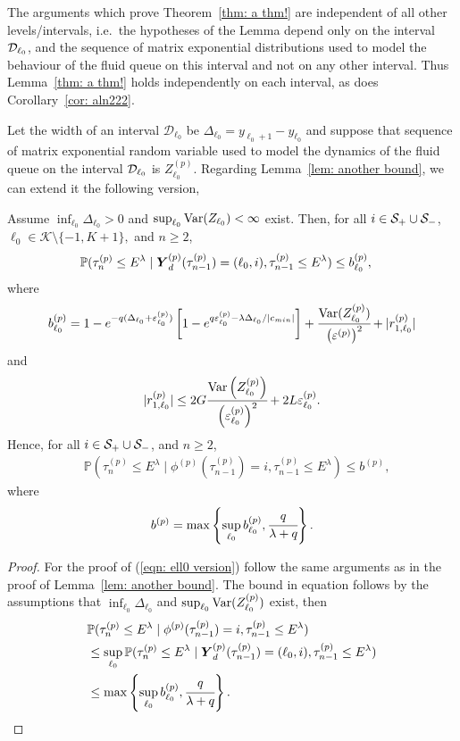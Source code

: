 The arguments which prove Theorem~\ref{thm: a thm!} are independent of all other levels/intervals, i.e.~the hypotheses of the Lemma depend only on the interval \(\mathcal{D}_{\ell_0}\), and the sequence of matrix exponential distributions used to model the behaviour of the fluid queue on this interval and not on any other interval. Thus Lemma~\ref{thm: a thm!} holds independently on each interval, as does Corollary~\ref{cor: aln222}.

Let the width of an interval \(\mathcal D_{\ell_0}\) be \(\Delta_{\ell_0}=y_{\ell_0+1}-y_{\ell_0}\) and suppose that sequence of matrix exponential random variable used to model the dynamics of the fluid queue on the interval \(\mathcal{D}_{\ell_0}\) is \(Z_{\ell_0}^{(p)}\). Regarding Lemma~\ref{lem: another bound}, we can extend it the following version, 
\begin{lem}\label{lem: another bound sdfg}
	Assume \(\inf_{\ell_0}\Delta_{\ell_0}>0\) and \(\sup_{\ell_0}\mathrm{Var}(Z_{\ell_0})<\infty\) exist. Then, for all \(i\in\mathcal S_+\cup \mathcal{S}_-\), \(\ell_0\in\mathcal K\setminus\{-1,K+1\},\) and \(n\geq 2\), 
	\begin{align}
		&\mathbb P(\tau_n^{(p)}\leq E^\lambda \mid \boldsymbol Y_d^{(p)}(\tau_{n-1}^{(p)}) = (\ell_0,i), \tau_{n-1}^{(p)}\leq  E^\lambda ) \leq b_{\ell_0}^{(p)},\label{eqn: ell0 version}
	\end{align}
	where 
	\[b_{\ell_0}^{(p)} = 1-e^{-q(\Delta_{\ell_0}+\varepsilon_{\ell_0}^{(p)})}\left[1-e^{q\varepsilon_{\ell_0}^{(p)}-\lambda \Delta_{\ell_0}/|c_{min}|}\right] + \cfrac{\mathrm{Var}(Z_{\ell_0}^{(p)})}{\left(\varepsilon^{(p)}\right)^2} + |r_{1,\ell_0}^{(p)}| \]
	and  
	\[|r_{1,\ell_0}^{(p)}|\leq 2G\cfrac{\mathrm{Var} \left(Z_{\ell_0}^{(p)}\right)}{\left(\varepsilon_{\ell_0}^{(p)}\right)^2} + 2L\varepsilon_{\ell_0}^{(p)}.\]
	Hence, for all \(i\in\mathcal S_+\cup \mathcal{S}_-\), and \(n\geq 2\), 
	\begin{align}
		&\mathbb P(\tau_n^{(p)}\leq E^\lambda \mid \phi^{(p)}(\tau_{n-1}^{(p)})=i, \tau_{n-1}^{(p)}\leq  E^\lambda ) \leq b^{(p)}, \label{eqn: skjhg}
	\end{align}
	where 
	\[b^{(p)} = \max\left\{\sup_{\ell_0}b_{\ell_0}^{(p)}, \cfrac{q}{\lambda + q}\right\}.\]
\end{lem}
\begin{proof}
	For the proof of (\ref{eqn: ell0 version}) follow the same arguments as in the proof of Lemma~\ref{lem: another bound}. The bound in equation follows by the assumptions that \(\inf_{\ell_0}\Delta_{\ell_0}\) and \(\sup_{\ell_0}\mathrm{Var}(Z_{\ell_0}^{(p)})\) exist, then 
	\begin{align*}
		&\mathbb P(\tau_n^{(p)}\leq E^\lambda \mid \phi^{(p)}(\tau_{n-1}^{(p)})=i, \tau_{n-1}^{(p)}\leq  E^\lambda ) 
		\\&\leq \sup_{\ell_0} \mathbb P(\tau_n^{(p)}\leq E^\lambda \mid \boldsymbol Y_d^{(p)}(\tau_{n-1}^{(p)}) = (\ell_0, i), \tau_{n-1}^{(p)}\leq  E^\lambda ) 
		\\&\leq \max\left\{\sup_{\ell_0}b_{\ell_0}^{(p)}, \cfrac{q}{\lambda + q}\right\}.\label{eqn: ell0 versionlskhg}
	\end{align*}
\end{proof}
